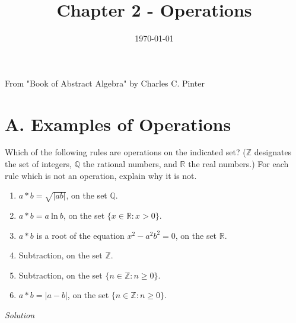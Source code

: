 \documentclass[12pt]{article}
\begin{document}
\title{Chapter 2 - Operations}
\date{\today}
\maketitle


From "Book of Abstract Algebra" by Charles C. Pinter
  
\section*{A. Examples of Operations}
Which of the following rules are operations on the indicated set? ($\mathbb{Z}$ 
designates the set of integers, $\mathbb{Q}$ the rational numbers, and $\mathbb{R}$ 
the real numbers.) For each rule which is not an operation, explain why it is not.
  \begin{enumerate}
    \item $a * b = \sqrt{|ab|}$, on the set $\mathbb{Q}$.
    \item $a * b = a~\text{ln}~b$, on the set $\{x \in \mathbb{R}: x > 0\}$.
    \item $a * b$ is a root of the equation $x^{2} - a^{2}b^{2} = 0$, on the set $\mathbb{R}$.
    \item Subtraction, on the set $\mathbb{Z}$.
    \item Subtraction, on the set $\{ n \in \mathbb{Z}:n \geq 0 \}$.
    \item $a * b = |a-b|$, on the set $\{ n \in \mathbb{Z}: n \geq 0 \}$.
  \end{enumerate}
  \textit{Solution} \\
\end{document}
